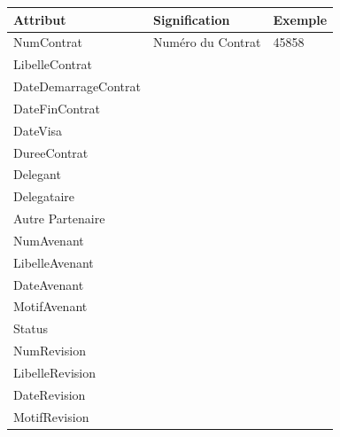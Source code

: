\documentclass[a4paper]{report}
\begin{document}
\begin{doublespace}
	\begin{table}[H]
		\begin{center}
			\begin{tabularx}{17.5cm}{|X|p{3cm}|p{1.5cm}|}
				\hline
				\textbf{Attribut}    & \textbf{Signification} & \textbf{Exemple} \\
				\hline
				NumContrat           & Numéro du Contrat      & 45858            \\
				\hline
				LibelleContrat       &                        &                  \\
				\hline
				DateDemarrageContrat &                        &                  \\
				\hline
				DateFinContrat       &                        &                  \\
				\hline
				DateVisa             &                        &                  \\
				\hline
				DureeContrat         &                        &                  \\
				\hline
				Delegant             &                        &                  \\
				\hline
				Delegataire          &                        &                  \\
				\hline
				Autre Partenaire     &                        &                  \\
				\hline
				NumAvenant           &                        &                  \\
				\hline
				LibelleAvenant       &                        &                  \\
				\hline
				DateAvenant          &                        &                  \\
				\hline
				MotifAvenant         &                        &                  \\
				\hline
				Status               &                        &                  \\
				\hline
				NumRevision          &                        &                  \\
				\hline
				LibelleRevision      &                        &                  \\
				\hline
				DateRevision         &                        &                  \\
				\hline
				MotifRevision        &                        &                  \\
				\hline
			\end{tabularx}

\end{center}
\end{table}
\end{doublespace}
\end{document}

